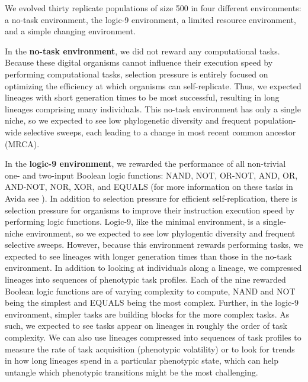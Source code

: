 \documentclass[letterpaper]{article}
\begin{document}
We evolved thirty replicate populations of size 500 in four different environments: a no-task environment, the logic-9 environment, a limited resource environment, and a simple changing environment. %


In the \textbf{no-task environment}, we did not reward any computational tasks. Because these digital organisms cannot influence their execution speed by performing computational tasks, selection pressure is entirely focused on optimizing the efficiency at which organisms can self-replicate. 
Thus, we expected lineages with short generation times to be most successful, resulting in long lineages comprising many individuals. This no-task environment has only a single niche, so we expected to see low phylogenetic diversity and frequent population-wide selective sweeps, each leading to a change in most recent common ancestor (MRCA).


In the \textbf{logic-9 environment}, we rewarded the performance of all non-trivial one- and two-input Boolean logic functions: NAND, NOT, OR-NOT, AND, OR, AND-NOT, NOR, XOR, and EQUALS (for more information on these tasks in Avida see \citep{lenski_evolutionary_2003}). In addition to selection pressure for efficient self-replication, there is selection pressure for organisms to improve their instruction execution speed by performing logic functions. 
Logic-9, like the minimal environment, is a single-niche environment, so we expected to see low phylogentic diversity and frequent selective sweeps. However, because this environment rewards performing tasks, we expected to see lineages with longer generation times than those in the no-task environment. 
In addition to looking at individuals along a lineage, we compressed lineages into sequences of phenotypic task profiles. Each of the nine rewarded Boolean logic functions are of varying complexity to compute, NAND and NOT being the simplest and EQUALS being the most complex. Further, in the logic-9 environment, simpler tasks are building blocks for the more complex tasks. 
As such, we expected to see tasks appear on lineages in roughly the order of task complexity.
We can also use lineages compressed into sequences of task profiles to measure the rate of task acquisition (phenotypic volatility) or to look for trends in how long lineages spend in a particular phenotypic state, which can help untangle which phenotypic transitions might be the most challenging.
\end{document}
